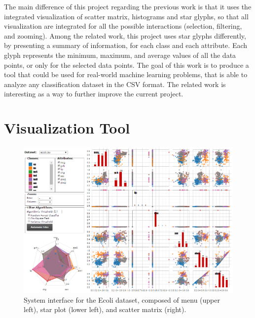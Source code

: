 \documentclass[journal]{IEEEtran}
\begin{document}
The main difference of this project regarding the previous work is that it uses the integrated visualization of scatter matrix, histograms and star glyphs, so that all visualization are integrated for all the possible interactions (selection, filtering, and zooming). Among the related work, this project uses star glyphs differently, by presenting a summary of information, for each class and each attribute. Each glyph represents the minimum, maximum, and average values of all the data points, or only for the selected data points. The goal of this work is to produce a tool that could be used for real-world machine learning problems, that is able to analyze any classification dataset in the CSV format. The related work is interesting as a way to further improve the current project.

\section{Visualization Tool}

\begin{figure}[!t]
  \centering
  \captionsetup{justification=centering}
  \includegraphics[width=6.0in]{images/overview}
  \caption{System interface for the Ecoli dataset, composed of menu (upper left), star plot (lower left), and scatter matrix (right).}
  \label{fig:overview}
\end{figure}
\end{document}
